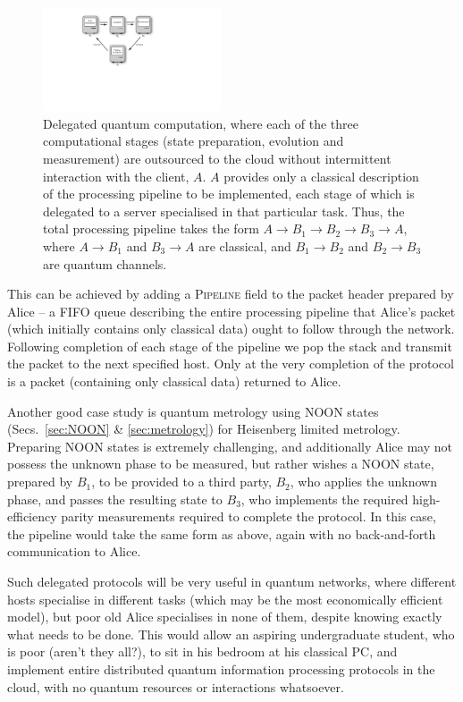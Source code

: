 \begin{figure}[htpb]
\includegraphics[width=0.47\textwidth]{delegated}
\caption{Delegated quantum computation, where each of the three computational stages (state preparation, evolution and measurement) are outsourced to the cloud without intermittent interaction with the client, $A$. $A$ provides only a classical description of the processing pipeline to be implemented, each stage of which is delegated to a server specialised in that particular task. Thus, the total processing pipeline takes the form \mbox{$A\to B_1\to B_2\to B_3\to A$}, where \mbox{$A\to B_1$} and \mbox{$B_3\to A$} are classical, and \mbox{$B_1\to B_2$} and \mbox{$B_2\to B_3$} are quantum channels.} \label{fig:delegated}
\end{figure}

This can be achieved by adding a \textsc{Pipeline} field to the packet header prepared by Alice -- a FIFO queue describing the entire processing pipeline that Alice's packet (which initially contains only classical data) ought to follow through the network. Following completion of each stage of the pipeline we pop the stack and transmit the packet to the next specified host. Only at the very completion of the protocol is a packet (containing only classical data) returned to Alice.

Another good case study is quantum metrology using NOON states (Secs.~\ref{sec:NOON} \& \ref{sec:metrology}) for Heisenberg limited metrology. Preparing NOON states is extremely challenging, and additionally Alice may not possess the unknown phase to be measured, but rather wishes a NOON state, prepared by $B_1$, to be provided to a third party, $B_2$, who applies the unknown phase, and passes the resulting state to $B_3$, who implements the required high-efficiency parity measurements required to complete the protocol. In this case, the pipeline would take the same form as above, again with no back-and-forth communication to Alice.

Such delegated protocols will be very useful in quantum networks, where different hosts specialise in different tasks (which may be the most economically efficient model), but poor old Alice specialises in none of them, despite knowing exactly what needs to be done. This would allow an aspiring undergraduate student, who is poor (aren't they all?), to sit in his bedroom at his classical PC, and implement entire distributed quantum information processing protocols in the cloud, with no quantum resources or interactions whatsoever.

